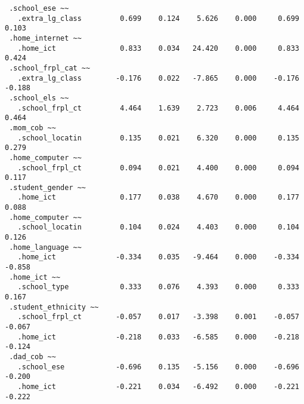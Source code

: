 \documentclass[
]{article}
\begin{document}
\begin{verbatim}
 .school_ese ~~                                                               
   .extra_lg_class         0.699    0.124    5.626    0.000     0.699    0.103
 .home_internet ~~                                                            
   .home_ict               0.833    0.034   24.420    0.000     0.833    0.424
 .school_frpl_cat ~~                                                          
   .extra_lg_class        -0.176    0.022   -7.865    0.000    -0.176   -0.188
 .school_els ~~                                                               
   .school_frpl_ct         4.464    1.639    2.723    0.006     4.464    0.464
 .mom_cob ~~                                                                  
   .school_locatin         0.135    0.021    6.320    0.000     0.135    0.279
 .home_computer ~~                                                            
   .school_frpl_ct         0.094    0.021    4.400    0.000     0.094    0.117
 .student_gender ~~                                                           
   .home_ict               0.177    0.038    4.670    0.000     0.177    0.088
 .home_computer ~~                                                            
   .school_locatin         0.104    0.024    4.403    0.000     0.104    0.126
 .home_language ~~                                                            
   .home_ict              -0.334    0.035   -9.464    0.000    -0.334   -0.858
 .home_ict ~~                                                                 
   .school_type            0.333    0.076    4.393    0.000     0.333    0.167
 .student_ethnicity ~~                                                        
   .school_frpl_ct        -0.057    0.017   -3.398    0.001    -0.057   -0.067
   .home_ict              -0.218    0.033   -6.585    0.000    -0.218   -0.124
 .dad_cob ~~                                                                  
   .school_ese            -0.696    0.135   -5.156    0.000    -0.696   -0.200
   .home_ict              -0.221    0.034   -6.492    0.000    -0.221   -0.222


\end{verbatim}
\end{document}
